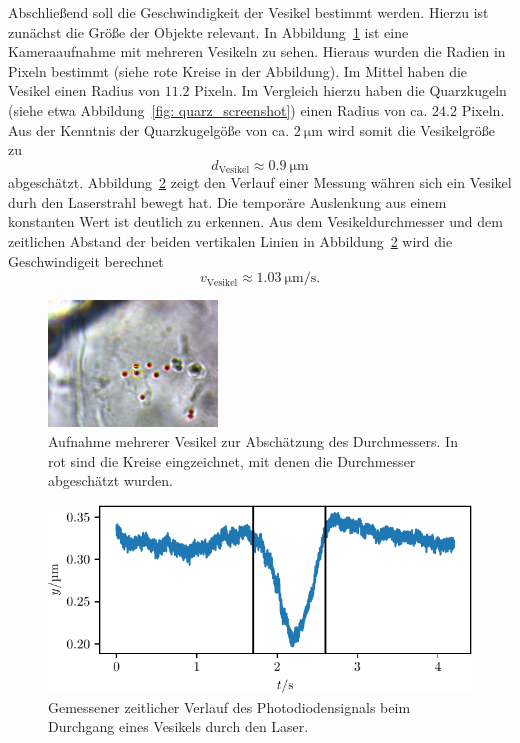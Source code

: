 Abschließend soll die Geschwindigkeit der Vesikel bestimmt werden. Hierzu ist zunächst die Größe der Objekte relevant.
In Abbildung~\ref{fig: vesikel_size} ist eine Kameraaufnahme mit mehreren Vesikeln zu sehen. Hieraus wurden die Radien in Pixeln
bestimmt (siehe rote Kreise in der Abbildung). Im Mittel haben die Vesikel einen Radius von $\num{11.2}$ Pixeln. Im Vergleich hierzu haben die Quarzkugeln (siehe etwa
Abbildung~\ref{fig: quarz_screenshot}) einen Radius von ca. $\num{24.2}$ Pixeln. Aus der Kenntnis der Quarzkugelgöße von ca. $\SI{2}{\micro\meter}$
wird somit die Vesikelgröße zu
\begin{equation}
d_{\text{Vesikel}} \approx \SI{0.9}{\micro\meter}
\end{equation}
abgeschätzt.
Abbildung~\ref{fig: velocity} zeigt den Verlauf einer Messung währen sich ein Vesikel durh den Laserstrahl bewegt hat. Die temporäre
Auslenkung aus einem konstanten Wert ist deutlich zu erkennen. Aus dem Vesikeldurchmesser und dem zeitlichen Abstand der beiden vertikalen
Linien in Abbildung~\ref{fig: velocity} wird die Geschwindigeit berechnet
\begin{equation}
  v_{\text{Vesikel}} \approx \SI{1.03}{\micro\meter\per\second}.
\end{equation}
\begin{figure}
  \centering
  \includegraphics[width = 0.4\textwidth]{../analysis/data/iii_zwiebel/bilder/particle_size_(2)_circles.png}
  \caption{Aufnahme mehrerer Vesikel zur Abschätzung des Durchmessers. In rot sind die Kreise eingzeichnet, mit denen
  die Durchmesser abgeschätzt wurden. }
  \label{fig: vesikel_size}
\end{figure}
\begin{figure}
  \centering
  \includegraphics[scale = 1]{../analysis/data/iii_zwiebel/velocity/velocity.pdf}
  \caption{Gemessener zeitlicher Verlauf des Photodiodensignals beim Durchgang eines Vesikels durch den Laser.}
  \label{fig: velocity}
\end{figure}
